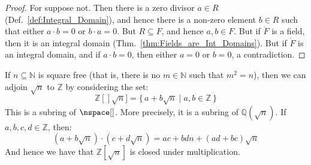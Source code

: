 \documentclass{article}                                                        %
\begin{document}
        \begin{proof}
            For suppose not. Then there is a zero divisor $a\in{R}$
            (Def.~\ref{def:Integral_Domain}), and hence there is a non-zero
            element $b\in{R}$ such that either $a\cdot{b}=0$ or $b\cdot{a}=0$.
            But $R\subseteq{F}$, and hence $a,b\in{F}$. But if $\ring{F}$ is a
            field, then it is an integral domain
            (Thm.~\ref{thm:Fields_are_Int_Domains}). But if $\ring{F}$ is an
            integral domain, and if $a\cdot{b}=0$, then either $a=0$ or $b=0$,
            a contradiction.
        \end{proof}
        \begin{example}
            If $n\subseteq\mathbb{N}$ is square free (that is, there is no
            $m\in\mathbb{N}$ such that $m^{2}=n$), then we can adjoin
            $\sqrt{n}$ to $\mathbb{Z}$ by considering the set:
            \begin{equation}
                \mathbb{Z}[]\sqrt{n}]=\{\,a+b\sqrt{n}\;|\;a,b\in\mathbb{Z}\,\}
            \end{equation}
            This is a subring of $\nspace[]$. More precisely, it is a subring of
            $\mathbb{Q}(\sqrt{n})$. If $a,b,c,d\in\mathbb{Z}$, then:
            \begin{equation}
                (a+b\sqrt{n})\cdot(c+d\sqrt{n})=ac+bdn+(ad+bc)\sqrt{n}
            \end{equation}
            And hence we have that $\mathbb{Z}[\sqrt{n}]$ is closed under
            multiplication.
        \end{example}
\end{document}

